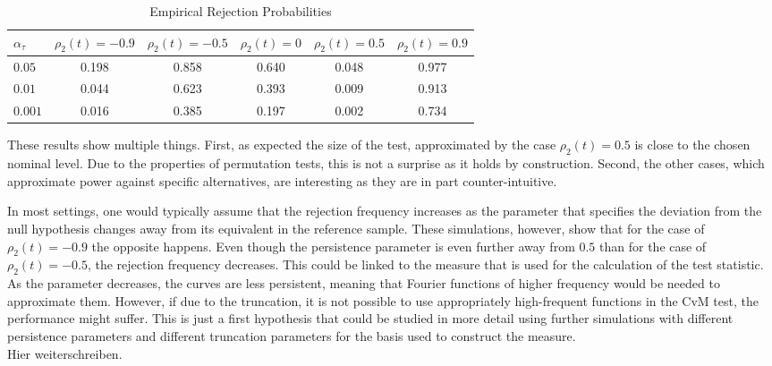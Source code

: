 \documentclass[12pt, a4paper]{article}
\theoremstyle{MAstyle} \newtheorem{assumption}{Assumption}[section]
\theoremstyle{MAstyle} \newtheorem{definition}{Definition}[section]
\theoremstyle{MAstyle} \newtheorem{theorem}{Theorem}[section]
\begin{document}
		\begin{table}[H]
			\centering
			\begin{tabular}{l|ccccc}\toprule
				$\alpha_{\tau}$ &$\rho_2(t) = -0.9$ &$\rho_2(t) = -0.5$ &$\rho_2(t) = 0$ &$\rho_2(t) = 0.5$ &$\rho_2(t) = 0.9$\\
				\midrule
				$0.05$	& 0.198 & 0.858  &  0.640 & 0.048   & 0.977  \\
				$0.01$ 	& 0.044	& 0.623  &  0.393 & 0.009   & 0.913  \\
				$0.001$	& 0.016	& 0.385  &  0.197 & 0.002   & 0.734  \\
				\bottomrule
			\end{tabular}
			\caption{Empirical Rejection Probabilities}
			\label{rej_probs_cor}
		\end{table}
		These results show multiple things. First, as expected the size of the test, approximated by the case $\rho_2(t) = 0.5$ is close to the chosen nominal level. Due to the properties of permutation tests, this is not a surprise as it holds by construction. Second, the other cases, which approximate power against specific alternatives, are interesting as they are in part counter-intuitive.
		
		In most settings, one would typically assume that the rejection frequency increases as the parameter that specifies the deviation from the null hypothesis changes away from its equivalent in the reference sample. These simulations, however, show that for the case of $\rho_2(t) = -0.9$ the opposite happens. Even though the persistence parameter is even further away from $0.5$ than for the case of $\rho_2(t) = -0.5$, the rejection frequency decreases. This could be linked to the measure that is used for the calculation of the test statistic. As the parameter decreases, the curves are less persistent, meaning that Fourier functions of higher frequency would be needed to approximate them. However, if due to the truncation, it is not possible to use appropriately high-frequent functions in the CvM test, the performance might suffer. This is just a first hypothesis that could be studied in more detail using further simulations with different persistence parameters and different truncation parameters for the basis used to construct the measure.\\
		
		{\color{red} Hier weiterschreiben.}
				
\end{document}
